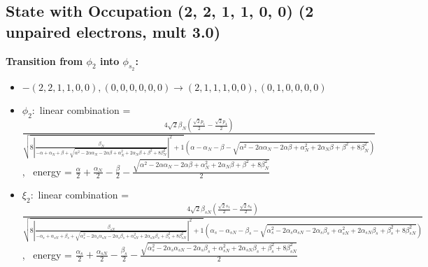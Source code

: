 \documentclass[12pt,a4paper]{article}
\begin{document}
\subsection*{State with Occupation (2, 2, 1, 1, 0, 0) (2 unpaired electrons, mult 3.0)}
        \noindent\textbf{Transition from $\phi_{2}$ into $\phi_{s_{2}}$:}
        \begin{itemize}
            \item $- (2, 2, 1, 1, 0, 0), (0, 0, 0, 0, 0, 0) \rightarrow (2, 1, 1, 1, 0, 0), (0, 1, 0, 0, 0, 0)$
        
            \item $\phi_{2}:$ linear combination = $\frac{4 \sqrt{2} \beta_{N} \left(\frac{\sqrt{2} p_{1}}{2} - \frac{\sqrt{2} p_{4}}{2}\right)}{\sqrt{8 \left|{\frac{\beta_{N}}{- \alpha + \alpha_{N} + \beta + \sqrt{\alpha^{2} - 2 \alpha \alpha_{N} - 2 \alpha \beta + \alpha_{N}^{2} + 2 \alpha_{N} \beta + \beta^{2} + 8 \beta_{N}^{2}}}}\right|^{2} + 1} \left(\alpha - \alpha_{N} - \beta - \sqrt{\alpha^{2} - 2 \alpha \alpha_{N} - 2 \alpha \beta + \alpha_{N}^{2} + 2 \alpha_{N} \beta + \beta^{2} + 8 \beta_{N}^{2}}\right)}$, \
            energy = $\frac{\alpha}{2} + \frac{\alpha_{N}}{2} - \frac{\beta}{2} - \frac{\sqrt{\alpha^{2} - 2 \alpha \alpha_{N} - 2 \alpha \beta + \alpha_{N}^{2} + 2 \alpha_{N} \beta + \beta^{2} + 8 \beta_{N}^{2}}}{2}$
            
            \item $\xi_{2}:$ linear combination = $\frac{4 \sqrt{2} \beta_{s N} \left(\frac{\sqrt{2} s_{1}}{2} - \frac{\sqrt{2} s_{4}}{2}\right)}{\sqrt{8 \left|{\frac{\beta_{s N}}{- \alpha_{s} + \alpha_{s N} + \beta_{s} + \sqrt{\alpha_{s}^{2} - 2 \alpha_{s} \alpha_{s N} - 2 \alpha_{s} \beta_{s} + \alpha_{s N}^{2} + 2 \alpha_{s N} \beta_{s} + \beta_{s}^{2} + 8 \beta_{s N}^{2}}}}\right|^{2} + 1} \left(\alpha_{s} - \alpha_{s N} - \beta_{s} - \sqrt{\alpha_{s}^{2} - 2 \alpha_{s} \alpha_{s N} - 2 \alpha_{s} \beta_{s} + \alpha_{s N}^{2} + 2 \alpha_{s N} \beta_{s} + \beta_{s}^{2} + 8 \beta_{s N}^{2}}\right)}$, \
            energy = $\frac{\alpha_{s}}{2} + \frac{\alpha_{s N}}{2} - \frac{\beta_{s}}{2} - \frac{\sqrt{\alpha_{s}^{2} - 2 \alpha_{s} \alpha_{s N} - 2 \alpha_{s} \beta_{s} + \alpha_{s N}^{2} + 2 \alpha_{s N} \beta_{s} + \beta_{s}^{2} + 8 \beta_{s N}^{2}}}{2}$
            

\end{itemize}
\end{document}
